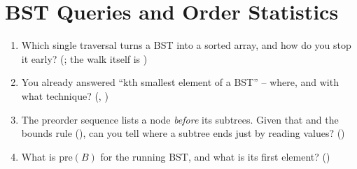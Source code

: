 \section{BST Queries and Order Statistics}\label{sec:c05-queries}

\begin{previouslybox}
\begin{enumerate}[nosep, leftmargin=1.6em]
  \item Which single traversal turns a BST into a sorted array, and how do you stop it early?
        (; the walk itself is )
  \item You already answered ``kth smallest element of a BST'' -- where, and with what technique?
        (, )
  \item The preorder sequence lists a node \emph{before} its subtrees. Given that and the bounds rule
        (), can you tell where a subtree ends just by reading values? ()
  \item What is $\mathrm{pre}(B)$ for the running BST, and what is its first element? ()
\end{enumerate}
\end{previouslybox}

